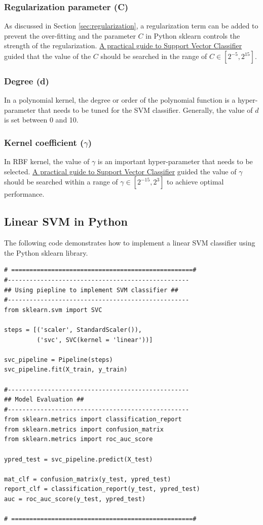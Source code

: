 \subsubsection{\textbf{Regularization parameter (C)}}
As discussed in Section \ref{sec:regularization}, a regularization term can be added to prevent the over-fitting and the parameter $C$ in Python sklearn controls the strength of the regularization. \href{https://www.csie.ntu.edu.tw/~cjlin/papers/guide/guide.pdf}{A practical guide to Support Vector Classifier} \cite{svmGuide:1984} guided that the value of the $C$ should be searched in the range of $C \in [2^{-5}, 2^15]$.

\subsubsection{\textbf{Degree (d)}}
In a polynomial kernel, the degree or order of the polynomial function is a hyper-parameter that needs to be tuned for the SVM classifier. Generally, the value of $d$ is set between 0 and 10.

\subsubsection{\textbf{Kernel coefficient ($\gamma$)}}
In RBF kernel, the value of $\gamma$ is an important hyper-parameter that needs to be selected. \href{https://www.csie.ntu.edu.tw/~cjlin/papers/guide/guide.pdf}{A practical guide to Support Vector Classifier} \cite{svmGuide:1984} guided the value of $\gamma$ should be searched within a range of $\gamma \in [2^{-15}, 2^3]$ to achieve optimal performance.

\newpage
\subsection{Linear SVM in Python}
The following code demonstrates how to implement a linear SVM classifier using the Python sklearn library.

\begin{lstlisting}
# ==================================================#
#--------------------------------------------------
## Using piepline to implement SVM classifier ##
#--------------------------------------------------
from sklearn.svm import SVC

steps = [('scaler', StandardScaler()),
         ('svc', SVC(kernel = 'linear'))]

svc_pipeline = Pipeline(steps)
svc_pipeline.fit(X_train, y_train)

#--------------------------------------------------
## Model Evaluation ##
#--------------------------------------------------
from sklearn.metrics import classification_report
from sklearn.metrics import confusion_matrix
from sklearn.metrics import roc_auc_score

ypred_test = svc_pipeline.predict(X_test)

mat_clf = confusion_matrix(y_test, ypred_test)
report_clf = classification_report(y_test, ypred_test)
auc = roc_auc_score(y_test, ypred_test)

# ==================================================#
\end{lstlisting}


